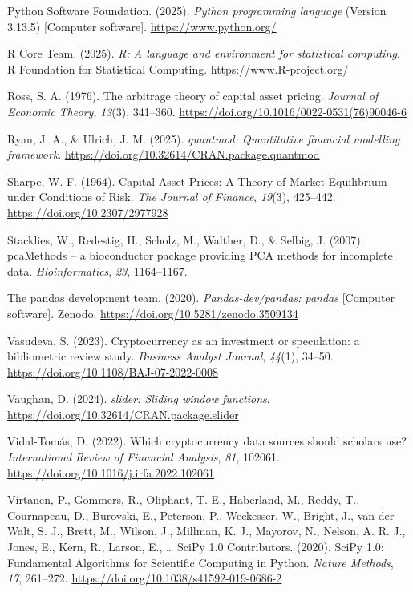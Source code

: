 \documentclass[
  12pt,
  a4paper,
  openany]{scrbook}
\newlength{\cslhangindent}
\newenvironment{CSLReferences}[2] %
 {\begin{list}{}{%
  \setlength{\itemindent}{0pt}
  \setlength{\leftmargin}{0pt}
  \setlength{\parsep}{0pt}
  \ifodd #1
   \setlength{\leftmargin}{\cslhangindent}
   \setlength{\itemindent}{-1\cslhangindent}
  \fi
  \setlength{\itemsep}{#2\baselineskip}}}
 {\end{list}}
\begin{document}
\begin{CSLReferences}{1}{0}
Python Software Foundation. (2025). \emph{Python programming language}
(Version 3.13.5) {[}Computer software{]}. \url{https://www.python.org/}

R Core Team. (2025). \emph{R: A language and environment for statistical
computing}. R Foundation for Statistical Computing.
\url{https://www.R-project.org/}

Ross, S. A. (1976). The arbitrage theory of capital asset pricing.
\emph{Journal of Economic Theory}, \emph{13}(3), 341--360.
\url{https://doi.org/10.1016/0022-0531(76)90046-6}

Ryan, J. A., \& Ulrich, J. M. (2025). \emph{{quantmod}: Quantitative
financial modelling framework}.
\url{https://doi.org/10.32614/CRAN.package.quantmod}

Sharpe, W. F. (1964). Capital Asset Prices: A Theory of Market
Equilibrium under Conditions of Risk. \emph{The Journal of Finance},
\emph{19}(3), 425--442. \url{https://doi.org/10.2307/2977928}

Stacklies, W., Redestig, H., Scholz, M., Walther, D., \& Selbig, J.
(2007). pcaMethods -- a bioconductor package providing PCA methods for
incomplete data. \emph{Bioinformatics}, \emph{23}, 1164--1167.

The pandas development team. (2020). \emph{Pandas-dev/pandas: pandas}
{[}Computer software{]}. Zenodo.
\url{https://doi.org/10.5281/zenodo.3509134}

Vasudeva, S. (2023). Cryptocurrency as an investment or speculation: a
bibliometric review study. \emph{Business Analyst Journal},
\emph{44}(1), 34--50. \url{https://doi.org/10.1108/BAJ-07-2022-0008}

Vaughan, D. (2024). \emph{{slider}: Sliding window functions}.
\url{https://doi.org/10.32614/CRAN.package.slider}

Vidal-Tomás, D. (2022). Which cryptocurrency data sources should
scholars use? \emph{International Review of Financial Analysis},
\emph{81}, 102061. \url{https://doi.org/10.1016/j.irfa.2022.102061}

Virtanen, P., Gommers, R., Oliphant, T. E., Haberland, M., Reddy, T.,
Cournapeau, D., Burovski, E., Peterson, P., Weckesser, W., Bright, J.,
van der Walt, S. J., Brett, M., Wilson, J., Millman, K. J., Mayorov, N.,
Nelson, A. R. J., Jones, E., Kern, R., Larson, E., \ldots{} SciPy 1.0
Contributors. (2020). {{SciPy} 1.0: Fundamental Algorithms for
Scientific Computing in Python}. \emph{Nature Methods}, \emph{17},
261--272. \url{https://doi.org/10.1038/s41592-019-0686-2}


\end{CSLReferences}
\end{document}
